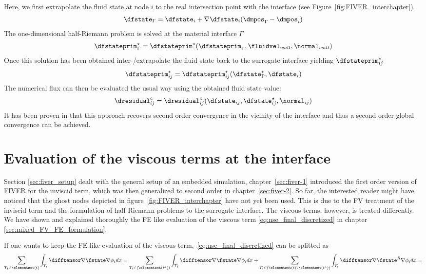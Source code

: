 \documentclass[../main.tex]{subfiles}
\begin{document}
Here, we first extrapolate the fluid state at node $i$ to the real intersection point with the interface (see Figure~\ref{fig:FIVER_interchapter}).
\begin{align}
\dfstate_{\Gamma} = \dfstate_i + \nabla \dfstate_i(\dmpos_{\Gamma}-\dmpos_i)
\end{align}
The one-dimensional half-Riemann problem is solved at the material interface $\Gamma$
\begin{align}
\dfstateprim^{\star}_{\Gamma} = \dfstateprim^{\star}(\dfstateprim_\Gamma,\fluidvel_{wall},\normal_{wall})
\end{align}
Once this solution has been obtained inter-/extrapolate the fluid state back to the surrogate interface yielding $\dfstateprim^{\star}_{ij}$
\begin{align}
\dfstateprim^{\star}_{ij} = \dfstateprim^{\star}_{ij}(\dfstate^{\star}_\Gamma,\dfstate_i) 
\end{align}
The numerical flux can then be evaluated the usual way using the obtained fluid state value:
\begin{align}
\dresidual^c_{ij} = \dresidual^c_{ij}(\dfstate_{ij},\dfstate^{\star}_{ij}, \normal_{ij})
\end{align}
It has been proven in \cite{Main2014} that this approach recovers second order convergence in the vicinity of the interface and thus a second order global convergence can be achieved.


\section{Evaluation of the viscous terms at the interface}\label{sec:fiver_viscous_term}
Section \ref{sec:fiver_setup} dealt with the general setup of an embedded simulation, chapter~\ref{sec:fiver-1} introduced the first order version of \ac{FIVER} for the inviscid term, which was then generalized to second order in chapter~\ref{sec:fiver-2}. So far, the interested reader might have noticed that the ghost nodes depicted in figure~\ref{fig:FIVER_interchapter} have not yet been used. This is due to the \ac{FV} treatment of the inviscid term and the formulation of half Riemann problems to the surrogate interface. The viscous terms, however, is treated differently.\\
We have shown and explained thoroughly the \ac{FE} like evaluation of the viscous term \eqref{eq:nse_final_discretized}  in chapter \ref{sec:mixed_FV_FE_formulation}.


If one wants to keep the \ac{FE}-like evaluation of the viscous term,~\eqref{eq:nse_final_discretized} can be splitted as
\begin{align}\label{eq:fiver_viscous_split}
\sum_{T_i \in \elementset(i)} \int_{T_i} \difftensor \nabla \fstate \nabla \phi_i dx=
\sum_{T_i \in \left(\elementset(i^a)\right)} \int_{T_i} \difftensor \nabla \fstate \nabla \phi_i dx+
\sum_{T_i \in \left(\elementset(i)\setminus\elementset(i^a)\right)} \int_{T_i} \difftensor \nabla \fstate^R \nabla \phi_i dx=
\end{align}
\end{document}
